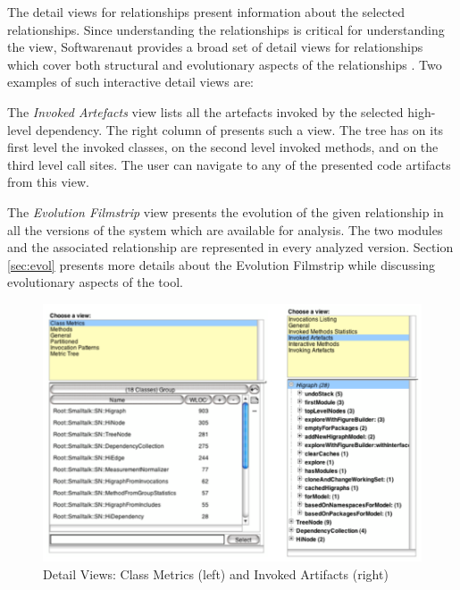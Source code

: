 \documentclass[preprint,12pt]{elsarticle}
\begin{document}
The detail views for relationships present information about the selected relationships. Since understanding the relationships is critical for understanding the view, Softwarenaut provides a broad set of detail views for relationships which cover both structural and evolutionary aspects of the relationships \cite{lungu-cutedge, lungu-relevo}. Two examples of such interactive detail views are:



\begin{description}
\item The {\em Invoked Artefacts} view lists all the artefacts invoked by the selected high-level dependency. The right column of  presents such a view. The tree has on its first level the invoked classes, on the second level invoked methods, and on the third level call sites. The user can navigate to any of the presented code artifacts from this view.
\item The {\em Evolution Filmstrip} view presents the evolution of the given relationship in all the versions of the system which are available for analysis. The two modules and the associated relationship are represented in every analyzed version. Section \ref{sec:evol} presents more details about the Evolution Filmstrip while discussing evolutionary aspects of the tool.
\end{description}

\begin{figure}[t!]
\begin{center}
\includegraphics[width=0.8\linewidth]{DetailsForEdgesAndNodes}
\caption{Detail Views: 
Class Metrics (left)
and 
Invoked Artifacts (right)} 
\end{center}
\end{figure}
\end{document}
